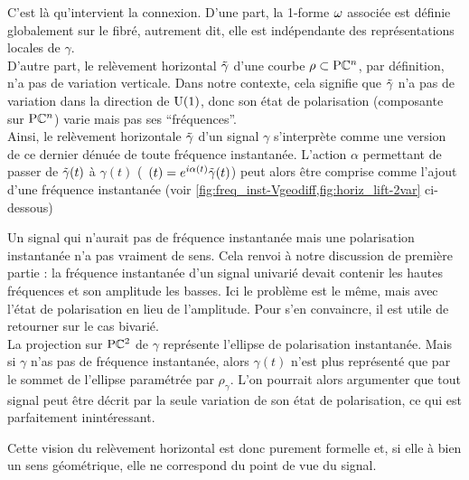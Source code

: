 C'est là qu'intervient la connexion. D'une part, la 1-forme $\omega$ associée est définie globalement sur le fibré, autrement dit, elle est indépendante des représentations locales de $\gamma$.
\\
D'autre part, le relèvement horizontal $\Tilde{\gamma}$ d'une courbe $\rho\subset\text{\normalfont P}\mathbb{C}^{n}$, par définition, n'a pas de variation verticale. Dans notre contexte, cela signifie que $\Tilde{\gamma}$ n'a pas de variation dans la direction de $\text{\normalfont U}(1)$, donc son état de polarisation (composante sur $\text{\normalfont P}\mathbb{C}^{n}$) varie mais pas ses ``fréquences''.
\\
Ainsi, le relèvement horizontale $\Tilde{\gamma}$ d'un signal $\gamma$ s'interprète comme une version de ce dernier dénuée de toute fréquence instantanée.
L'action $\alpha$ permettant de passer de $\Tilde{\gamma}(t)$ à $\gamma(t)$ (\ie~$(t) = e^{i\alpha(t)} \Tilde{\gamma}(t)$) peut alors être comprise comme l'ajout d'une fréquence instantanée (voir \cref{fig:freq_inst-Vgeodiff,fig:horiz_lift-2var} ci-dessous)	
\\

\begin{remarque}
	Un signal qui n'aurait pas de fréquence instantanée mais une polarisation instantanée n'a pas vraiment de sens. 
	Cela renvoi à notre discussion de première partie : la fréquence instantanée d'un signal univarié devait contenir les hautes fréquences et son amplitude les basses.
	Ici le problème est le même, mais avec l'état de polarisation en lieu de l’amplitude. Pour s'en convaincre, il est utile de retourner sur le cas bivarié.
	\\
	La projection sur $\text{\normalfont P}\mathbb{C}^{2}$ de $\gamma$ représente l'ellipse de polarisation instantanée. 
	Mais si $\gamma$ n'as pas de fréquence instantanée, alors $\gamma(t)$ n'est plus représenté que par le sommet de l’ellipse paramétrée par $\rho_\gamma$. 
	L'on pourrait alors argumenter que tout signal peut être décrit par la seule variation de son état de polarisation, ce qui est parfaitement inintéressant.
	
	Cette vision du relèvement horizontal est donc purement formelle et, si elle à bien un sens géométrique, elle ne correspond du point de vue du signal.
\end{remarque}
\skipl

